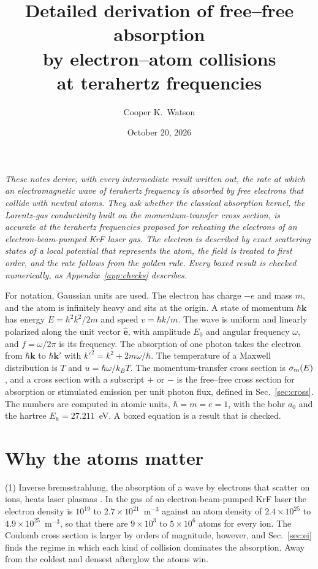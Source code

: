\documentclass[11pt]{article}
\title{Detailed derivation of free--free absorption\\ by electron--atom collisions\\
at terahertz frequencies}
\author{Cooper K.\ Watson}
\date{October 20, 2026}
\numberwithin{equation}{section}
\newcommand{\ehat}{\hat{\mathbf e}}
\newcommand{\kv}{\mathbf k}
\newcommand{\kB}{k_B}
\newcommand{\sm}{\sigma_{\rm m}}
\begin{document}
\maketitle

\noindent\emph{These notes derive, with every intermediate result written
out, the rate at which an electromagnetic wave of terahertz frequency is
absorbed by free electrons that collide with neutral atoms. They ask whether
the classical absorption kernel, the Lorentz-gas conductivity built on the
momentum-transfer cross section, is accurate at the terahertz frequencies
proposed for reheating the electrons of an electron-beam-pumped KrF laser
gas. The electron is described by exact scattering states of a local
potential that represents the atom, the field is treated to first order, and
the rate follows from the golden rule. Every boxed result is checked
numerically, as Appendix~\ref{app:checks} describes.}

\medskip
\noindent For notation, Gaussian units are used. The
electron has charge $-e$ and mass $m$, and the atom is infinitely heavy and
sits at the origin. A state of momentum $\hbar\kv$ has energy
$E=\hbar^2k^2/2m$ and speed $v=\hbar k/m$. The wave is uniform and linearly
polarized along the unit vector $\ehat$, with amplitude $E_0$ and angular
frequency $\omega$, and $f=\omega/2\pi$ is its frequency. The absorption of one
photon takes the electron from $\hbar\kv$ to $\hbar\kv'$ with
$k'^2=k^2+2m\omega/\hbar$. The temperature of a Maxwell distribution is $T$ and
$u=\hbar\omega/\kB T$. The momentum-transfer cross section is $\sm(E)$, and a
cross section with a subscript $+$ or $-$ is the free--free cross section for
absorption or stimulated emission per unit photon flux, defined in
Sec.~\ref{sec:cross}. The numbers are computed in atomic units, $\hbar=m=e=1$,
with the bohr $a_0$ and the hartree $E_h=27.211$~eV. A boxed equation is a
result that is checked.

\tableofcontents

\section{Why the atoms matter}
\label{sec:why}

{\noindent}(1) Inverse bremsstrahlung, the absorption of a wave by electrons
that scatter on ions, heats laser plasmas \cite{Atzeni2004}. In the gas of an electron-beam-pumped
KrF laser the electron density is $10^{19}$ to $2.7\times10^{21}$~m$^{-3}$
against an atom density of $2.4\times10^{25}$ to $4.9\times10^{25}$~m$^{-3}$,
so that there are $9\times10^3$ to $5\times10^6$ atoms for every ion. The
Coulomb cross section is larger by orders of magnitude, however, and
Sec.~\ref{sec:ei} finds the regime in which each kind of collision dominates
the absorption. Away from the coldest and densest afterglow the atoms win.
\end{document}
